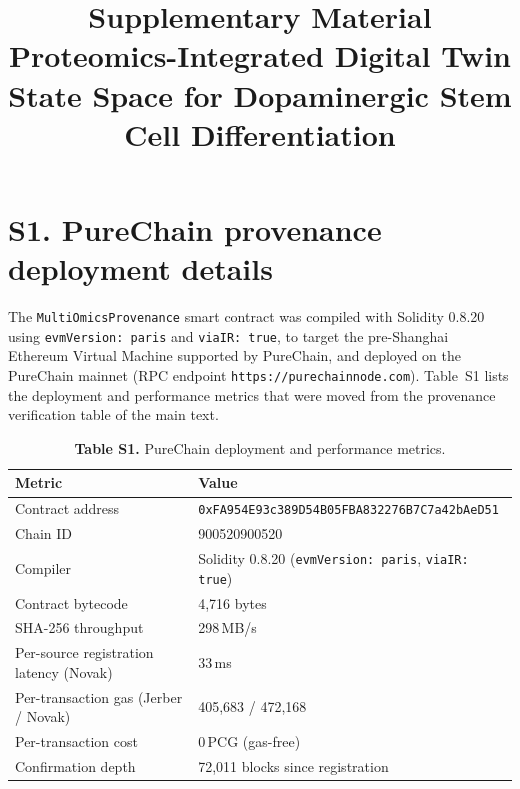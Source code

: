 \documentclass[11pt]{article}
\title{Supplementary Material\\[4pt]
\large Proteomics-Integrated Digital Twin State Space for
Dopaminergic Stem Cell Differentiation}
\date{}
\begin{document}
\maketitle
\color{red}

\section*{S1. PureChain provenance deployment details}

The \texttt{MultiOmicsProvenance} smart contract was compiled with
Solidity 0.8.20 using \texttt{evmVersion: paris} and
\texttt{viaIR: true}, to target the pre-Shanghai Ethereum Virtual
Machine supported by PureChain, and deployed on the PureChain
mainnet (RPC endpoint \texttt{https://purechainnode.com}).
Table~S1 lists the deployment and performance metrics that were
moved from the provenance verification table of the main text.

\begin{table}[h]
\centering
\caption*{\textbf{Table S1.} PureChain deployment and performance
metrics.}
\begin{tabular}{ll}
\toprule
Metric & Value \\
\midrule
Contract address & \texttt{0xFA954E93c389D54B05FBA832276B7C7a42bAeD51} \\
Chain ID & 900520900520 \\
Compiler & Solidity 0.8.20 (\texttt{evmVersion: paris}, \texttt{viaIR: true}) \\
Contract bytecode & 4,716 bytes \\
SHA-256 throughput & 298\,MB/s \\
Per-source registration latency (Novak) & 33\,ms \\
Per-transaction gas (Jerber / Novak) & 405,683 / 472,168 \\
Per-transaction cost & 0\,PCG (gas-free) \\
Confirmation depth & 72,011 blocks since registration \\
\bottomrule
\end{tabular}
\end{table}
\end{document}
